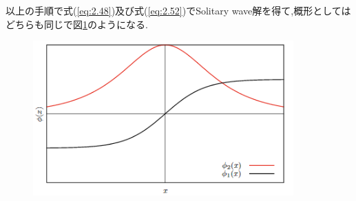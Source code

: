 \documentclass[dvipdfmx,11pt,a4paper]{jsbook}
\begin{document}
以上の手順で式(\ref{eq:2.48})及び式(\ref{eq:2.52})でSolitary wave解を得て,概形としてはどちらも同じで図\ref{2-coupled-phi_typeB}のようになる.
\begin{figure}[H]
    \centering
    \includegraphics[width=10cm]{figure/2-coupled-phi_typeB.png}
    \caption{}
    \label{2-coupled-phi_typeB}
\end{figure}
\end{document}
